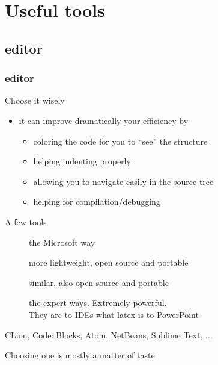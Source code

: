 \section[Tool]{Useful tools}

\subsection[Editor]{\cpp editor}

\begin{frame}[fragile]
  \frametitle{\cpp editor}
  \begin{block}{Choose it wisely}
    \begin{itemize}
    \item it can improve dramatically your efficiency by
      \begin{itemize}
      \item coloring the code for you to ``see'' the structure
      \item helping indenting properly
      \item allowing you to navigate easily in the source tree
      \item helping for compilation/debugging
      \end{itemize}
    \end{itemize}
  \end{block}
  \begin{block}{A few tools}
    \begin{description}
    \item[\href{http://www.microsoft.com/}{}]
      the Microsoft way
    \item[\href{https://code.visualstudio.com/}{}]
      more lightweight, open source and portable
    \item[\href{https://www.eclipse.org/}{}]
      similar, also open source and portable
    \item[\href{http://www.gnu.org/software/emacs/}{} \href{https://www.vim.org/}{}]
      the expert ways. Extremely powerful. \\
      They are to IDEs what latex is to PowerPoint
    \item[CLion, Code::Blocks, Atom, NetBeans, Sublime Text, ...]
    \end{description}
    Choosing one is mostly a matter of taste
  \end{block}
\end{frame}

